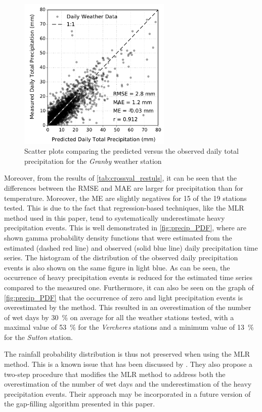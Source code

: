 \documentclass[TechnicalNoteMeteo.tex]{subfiles}
\begin{document}
\begin{figure}[!th]
    \includegraphics[width=0.65\textwidth]{img/Total_Precip_(mm)}
    \caption{Scatter plots comparing the predicted versus the observed daily total precipitation for the \emph{Granby} weather station}
    \label{fig:precip_err}
\end{figure}

Moreover, from the results of \cref{tab:crossval_restuls}, it can be seen that the differences between the RMSE and MAE are larger for precipitation than for temperature. Moreover, the ME are slightly negatives for 15 of the 19 stations tested. This is due to the fact that regression-based techniques, like the MLR method used in this paper, tend to systematically underestimate heavy precipitation events. This is well demonstrated in \cref{fig:precip_PDF}, where are shown gamma probability density functions that were estimated from the estimated (dashed red line) and observed (solid blue line) daily precipitation time series. The histogram of the distribution of the observed daily precipitation events is also shown on the same figure in light blue. As can be seen, the occurrence of heavy precipitation events is reduced for the estimated time series compared to the measured one. Furthermore, it can also be seen on the graph of \cref{fig:precip_PDF} that the occurrence of zero and light precipitation events is overestimated by the method. This resulted in an overestimation of the number of wet days by \SI{30}{\percent} on average for all the weather stations tested, with a maximal value of \SI{53}{\percent} for the \emph{Vercheres} stations and a minimum value of \SI{13}{\percent} for the \emph{Sutton} station.

The rainfall probability distribution is thus not preserved when using the MLR method. This is a known issue that has been discussed by \cite{simolo_improving_2010}. They also propose a two-step procedure that modifies the MLR method to address both the overestimation of the number of wet days and the underestimation of the heavy precipitation events. Their approach may be incorporated in a future version of the gap-filling algorithm presented in this paper.
\end{document}
